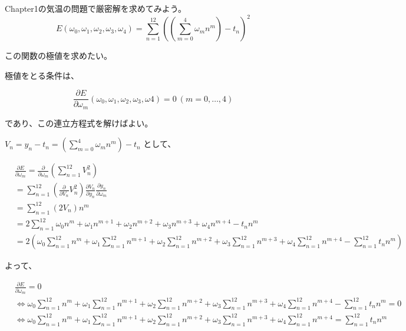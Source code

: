 \documentclass{jsarticle}
\begin{document}
Chapter1の気温の問題で厳密解を求めてみよう。
\begin{equation}
	E(\omega_0,\omega_1,\omega_2,\omega_3,\omega_4)
	=\sum_{n=1}^{12} \left( \left( \sum_{m=0}^4 \omega_m n^m \right) - t_n \right) ^2 
\end{equation}

この関数の極値を求めたい。

極値をとる条件は、

\begin{equation*}
	\frac{\partial E}{\partial \omega_m}
	(\omega_0,\omega_1,\omega_2,\omega_3,\omega4)=0\:(m=0, \dots,4)
\end{equation*}

であり、この連立方程式を解けばよい。

$\displaystyle V_n=y_n-t_n=(\sum_{m=0}^{4} \omega_m n^m) - t_n$ として、

\begin{align*}
	& \frac{\partial E}{\partial \omega_m} 
	= \frac{\partial}{\partial \omega_m} (\sum_{n=1}^{12} V_n^2) \\
	&= \sum_{n=1}^{12} 
	\left( \frac{\partial} {\partial V_n} V_n^2 \right) 
	\frac{\partial V_n}{\partial y_n} \frac{\partial y_n}{\partial \omega_m} \\
	&= \sum_{n=1}^{12} (2V_n) n^m \\
	&= 2\sum_{n=1}^{12} \omega_0 n^m 
	+ \omega_1 n^{m+1} 
	+ \omega_2 n^{m+2} 
	+ \omega_3 n^{m+3} 
	+ \omega_4 n^{m+4} 
	- t_n n^m \\
	&= 2 \left( \omega_0 \sum_{n=1}^{12} n^{m}
	+ \omega_1 \sum_{n=1}^{12} n^{m + 1}
	+ \omega_2 \sum_{n=1}^{12} n^{m + 2}
	+ \omega_3 \sum_{n=1}^{12} n^{m + 3}
	+ \omega_4 \sum_{n=1}^{12} n^{m + 4}
	- \sum_{n=1}^{12} t_n n^m \right)
\end{align*}

よって、

\begin{align*}
	& \frac{\partial E}{\partial \omega_m} = 0 \\
	& \Leftrightarrow 
	\omega_0 \sum_{n=1}^{12} n^{m}
	+ \omega_1 \sum_{n=1}^{12} n^{m + 1}
	+ \omega_2 \sum_{n=1}^{12} n^{m + 2}
	+ \omega_3 \sum_{n=1}^{12} n^{m + 3}
	+ \omega_4 \sum_{n=1}^{12} n^{m + 4}
	- \sum_{n=1}^{12} t_n n^m  = 0 \\
	& \Leftrightarrow
	\omega_0 \sum_{n=1}^{12} n^{m}
	+ \omega_1 \sum_{n=1}^{12} n^{m + 1}
	+ \omega_2 \sum_{n=1}^{12} n^{m + 2}
	+ \omega_3 \sum_{n=1}^{12} n^{m + 3}
	+ \omega_4 \sum_{n=1}^{12} n^{m + 4}
	= \sum_{n=1}^{12} t_n n^m
\end{align*}
\end{document}

